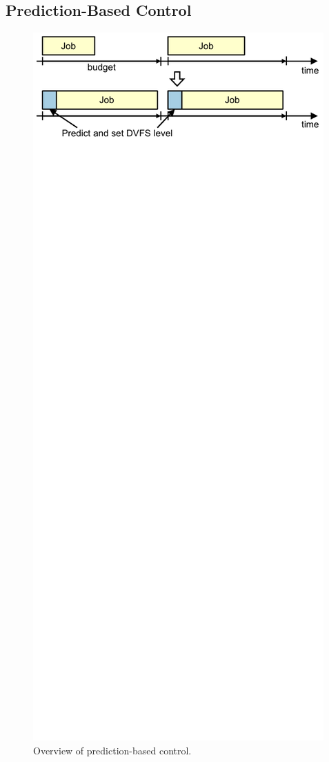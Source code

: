 \subsection{Prediction-Based Control}

\begin{figure}
  \begin{center}
    \includegraphics{exec_time_prediction/figs/prediction_overview.pdf}
    \caption{Overview of prediction-based control.}
    \label{fig:exec_time_prediction.applications.prediction_overview}
  \end{center}
\end{figure}


